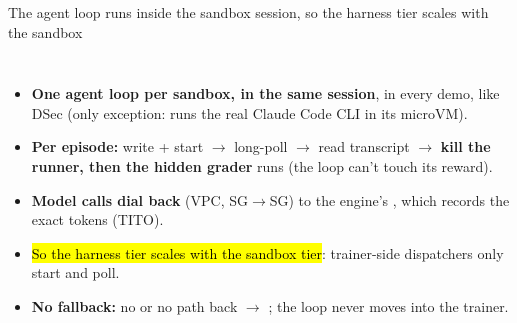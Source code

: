 \begin{frame}{The agent loop runs inside the sandbox session, so the harness tier scales with the sandbox}
\begin{columns}[T]
\begin{itemize}\footnotesize\setlength{\itemsep}{1.4mm}
\item \textbf{One agent loop per sandbox, in the same session}, in every demo, like DSec (only exception:  runs the real Claude Code CLI in its microVM).
\item \textbf{Per episode:} write + start  $\rightarrow$ long-poll $\rightarrow$ read transcript $\rightarrow$ \textbf{kill the runner, then the hidden grader} runs (the loop can't touch its reward).
\item \textbf{Model calls dial back} (VPC, SG$\rightarrow$SG) to the engine's , which records the exact tokens (TITO).
\item \hl{So the harness tier scales with the sandbox tier}: trainer-side dispatchers only start and poll.
\item \textbf{No fallback:} no  or no path back $\rightarrow$ ; the loop never moves into the trainer.
\end{itemize}
\centering
{}
\end{columns}
\end{frame}

